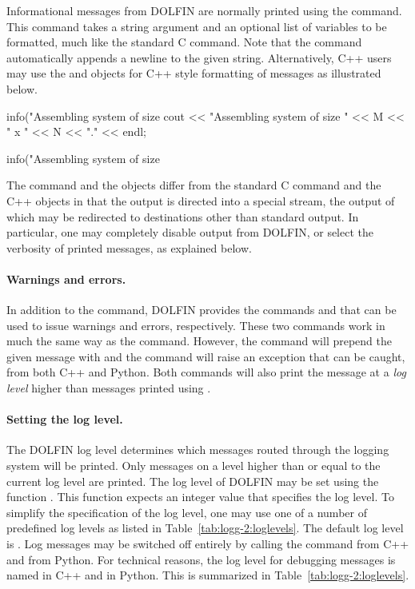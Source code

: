 Informational messages from DOLFIN are normally printed using the
 command. This command takes a string argument and an
optional list of variables to be formatted, much like the standard
C  command. Note that the  command
automatically appends a newline to the given string. Alternatively,
C++ users may use the  and  objects
for C++ style formatting of messages as illustrated below.
\begin{c++}
info("Assembling system of size %
cout << "Assembling system of size " << M << " x " << N << "." << endl;
\end{c++}
\begin{python}
info("Assembling system of size %
\end{python}
The  command and the  objects differ
from the standard C  command and the C++
 objects in that the output is directed into a
special stream, the output of which may be redirected to destinations
other than standard output. In particular, one may completely disable
output from DOLFIN, or select the verbosity of printed messages, as
explained below.

\paragraph{Warnings and errors.}

In addition to the  command, DOLFIN provides the
commands  and  that can be used to issue
warnings and errors, respectively. These two commands work in much the
same way as the  command. However, the  command
will prepend the given message with  and the
 command will raise an exception that can be caught, from
both C++ and Python. Both commands will also print the message at a
\emph{log level} higher than messages printed using .

\paragraph{Setting the log level.}

The DOLFIN log level determines which messages routed through the
logging system will be printed. Only messages on a level higher than
or equal to the current log level are printed. The log level of DOLFIN
may be set using the function . This function
expects an integer value that specifies the log level. To simplify the
specification of the log level, one may use one of a number of
predefined log levels as listed in Table~\ref{tab:logg-2:loglevels}. The default log
level is . Log messages may be switched off entirely by
calling the command  from C++ and
 from Python. For technical reasons, the
log level for debugging messages is named  in C++ and
 in Python. This is summarized in
Table~\ref{tab:logg-2:loglevels}.

